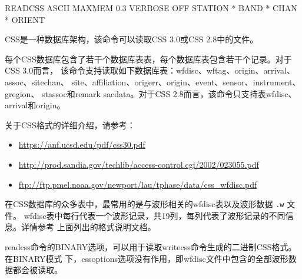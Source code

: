 \begin{SACSTX}
READCSS ASCII MAXMEM 0.3 VERBOSE OFF STATION * BAND * CHAN * ORIENT
\end{SACSTX}

CSS是一种数据库架构，该命令可以读取CSS 3.0或CSS 2.8中的文件。

每个CSS数据库包含了若干个数据库表表，每个数据库表包含若干个记录。对于CSS 3.0而言，
该命令支持读取如下数据库表：wfdisc、wftag、origin、arrival、assoc、sitechan、
site、affiliation、origerr、origin、event、sensor、instrument、gregion、
stassoc和remark sacdata。对于CSS 2.8而言，该命令只支持表wfdisc、arrival和origin。

关于CSS格式的详细介绍，请参考：
\begin{itemize}
\item \url{https://anf.ucsd.edu/pdf/css30.pdf}
\item \url{http://prod.sandia.gov/techlib/access-control.cgi/2002/023055.pdf}
\item \url{ftp://ftp.pmel.noaa.gov/newport/lau/tphase/data/css_wfdisc.pdf}
\end{itemize}

在CSS数据库的众多表中，最常用的是与波形相关的wfdisc表以及波形数据 \texttt{.w} 文件。
wfdisc表中每行代表一个波形记录，共19列，每列代表了波形记录的不同信息。详情参考
上面列出的格式说明文档。

readcss命令的BINARY选项，可以用于读取writecss命令生成的二进制CSS格式。在BINARY模式
下，cssoptions选项没有作用，即wfdisc文件中包含的全部波形数据都会被读取。
